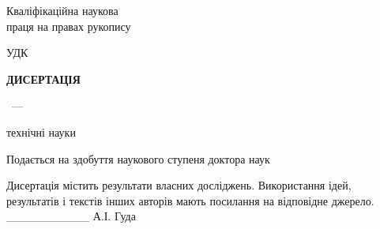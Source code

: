 \thispagestyle{empty}
{}

\begin{center}

\institutionMain

\belongMain

\end{center}

\vspace{3ex}


\begin{flushright}
{
Кваліфікаційна наукова \\
праця на правах рукопису
}
\end{flushright}

\vspace{3ex}

\begin{center}
\dissauthorFullMain
\end{center}

\vspace{2ex}

\begin{flushright}
УДК \UDC
\end{flushright}


\begin{center}
{\large\bfseries\scshape ДИСЕРТАЦІЯ }

\vspace{3ex}

{\large\scshape \bookname}


\dissSpecId\ --- \dissSpecMain

\vspace{1ex}

технічні науки

\vspace{3ex}

Подається на здобуття наукового ступеня доктора наук

\end{center}%

\vspace{2ex}

{
\noindent
\small
Дисертація містить результати власних досліджень. Використання ідей,
результатів і текстів інших авторів мають посилання на відповідне джерело.\\
\_\_\_\_\_\_\_\_\_\_ А.І. Гуда
}

